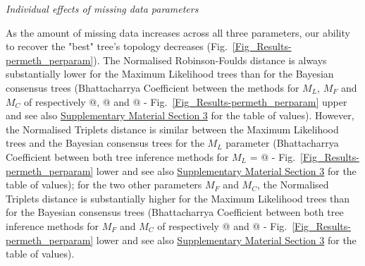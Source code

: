 \documentclass[12pt,letterpaper]{article}
\renewcommand{\subsection}[1]{%
\bigskip
\begin{center}
\begin{large}
\normalfont\itshape #1
\end{large}
\end{center}}
\begin{document}
\subsection{Individual effects of missing data parameters}
As the amount of missing data increases across all three parameters, our ability to recover the "best" tree's topology decreases (Fig.~\ref{Fig_Results-permeth_perparam}).
The Normalised Robinson-Foulds distance is always substantially lower for the Maximum Likelihood %
 trees than for the Bayesian consensus trees %
(Bhattacharrya Coefficient between the methods for $M_{L}$, $M_{F}$ and $M_{C}$ of respectively @, @ and @  %
- Fig.~\ref{Fig_Results-permeth_perparam} upper and see also \hyperref[SupplementaryMaterial]{Supplementary Material Section 3} for the table of values).
However, the Normalised Triplets distance is similar between the Maximum Likelihood trees and the Bayesian consensus trees for the $M_{L}$ parameter (Bhattacharrya Coefficient between both tree inference methods for $M_{L}$ = @ %
- Fig.~\ref{Fig_Results-permeth_perparam} lower and see also \hyperref[SupplementaryMaterial]{Supplementary Material Section 3} for the table of values); for the two other parameters $M_{F}$ and $M_{C}$, the Normalised Triplets distance is substantially higher for the Maximum Likelihood trees than for the Bayesian consensus trees (Bhattacharrya Coefficient between both tree inference methods for $M_{F}$ and $M_{C}$ of respectively @ and @  %
- Fig.~\ref{Fig_Results-permeth_perparam} lower and see also \hyperref[SupplementaryMaterial]{Supplementary Material Section 3} for the table of values).

\end{document}

